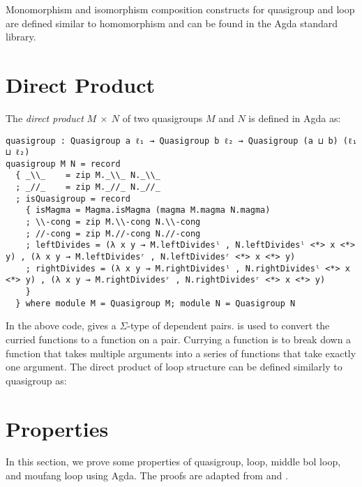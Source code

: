 Monomorphism and isomorphism composition constructs for quasigroup and loop are
defined similar to homomorphism and can be found in the Agda standard library.

\section{Direct Product}
The \textit{direct product} $M \ \times \ N$ of two quasigroups $M$ and $N$ is
defined in Agda as:

\begin{verbatim}
quasigroup : Quasigroup a ℓ₁ → Quasigroup b ℓ₂ → Quasigroup (a ⊔ b) (ℓ₁ ⊔ ℓ₂)
quasigroup M N = record
  { _\\_    = zip M._\\_ N._\\_
  ; _//_    = zip M._//_ N._//_
  ; isQuasigroup = record
    { isMagma = Magma.isMagma (magma M.magma N.magma)
    ; \\-cong = zip M.\\-cong N.\\-cong
    ; //-cong = zip M.//-cong N.//-cong
    ; leftDivides = (λ x y → M.leftDividesˡ , N.leftDividesˡ <*> x <*> y) , (λ x y → M.leftDividesʳ , N.leftDividesʳ <*> x <*> y)
    ; rightDivides = (λ x y → M.rightDividesˡ , N.rightDividesˡ <*> x <*> y) , (λ x y → M.rightDividesʳ , N.rightDividesʳ <*> x <*> y)
    }
  } where module M = Quasigroup M; module N = Quasigroup N
\end{verbatim}

In the above code,  gives a $\Sigma$-type of dependent pairs.
\inline{<*>} is used to convert the curried functions to a function on a pair.
Currying a function is to break down a function that takes multiple arguments
into a series of functions that take exactly one argument. The direct product of
loop structure can be defined similarly to quasigroup as: 

\section{Properties}
In this section, we prove some properties of quasigroup, loop, middle bol loop, and moufang loop using
Agda. The proofs are adapted from \cite{Stener2016MoufangL} and \cite{bruck1944some}.
